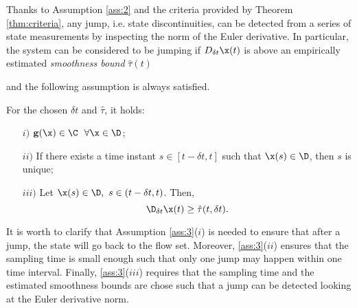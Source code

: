 Thanks to Assumption \ref{ass:2} and the criteria provided by Theorem \ref{thm:criteria}, any jump, i.e. state discontinuities, can be detected from a series of state measurements by inspecting the norm of the Euler derivative. In particular, the system can be considered to be jumping if $D_{\delta t}\x(t)$ is above an empirically estimated \textit{smoothness bound} $\hat{\tau}(t)$
%
{%
and the following assumption is always satisfied.%
\begin{assum}\label{ass:3}
    For the chosen $\delta t$ and $\hat{\tau}$, it holds:
    \begin{itemize}
        \item[$i)$] $\mathbf{g}(\x)\in\C~~\forall\x\in\D$;
        \item[$ii)$] If there exists a time instant $s\in[t-\delta t,t]$ such that $\x(s)\in\D$, then $s$ is unique; %
        \item[$iii)$] Let $\x(s)\in\D,~s\in(t-\delta t,t)$. Then,    
        \begin{equation}\label{eq:ass3.3}
            \D_{\delta t} \x(t)\geq \hat{\tau}(t,\delta t).
        \end{equation}
    \end{itemize}
\end{assum}
}
%
It is worth to clarify that Assumption \ref{ass:3}($i$) is needed to ensure that after a jump, the state will go back to the flow set. Moreover,  \ref{ass:3}($ii$) ensures that the sampling time is small enough such that only one jump may happen within one time interval. Finally, \ref{ass:3}($iii$) requires that the sampling time and the estimated smoothness bounds are chose such that a jump can be detected looking at the Euler derivative norm.

